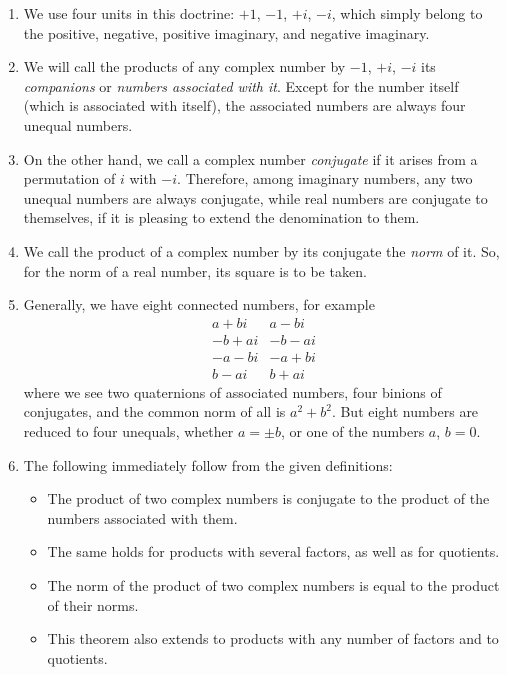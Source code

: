 \documentclass[twoside,12pt, showframe]{memoir}
\begin{document}
\begin{enumerate}
  \item We use four units in this doctrine: \(+1\), \(-1\), \(+i\), \(-i\), which simply belong to the positive, negative, positive imaginary, and negative imaginary.
  
  \item We will call the products of any complex number by \(-1\), \(+i\), \(-i\) its \textit{companions} or \textit{numbers associated with it}. Except for the number itself (which is associated with itself), the associated numbers are always four unequal numbers.
  
  \item On the other hand, we call a complex number \textit{conjugate} if it arises from a permutation of \(i\) with \(-i\). Therefore, among imaginary numbers, any two unequal numbers are always conjugate, while real numbers are conjugate to themselves, if it is pleasing to extend the denomination to them.
  
  \item We call the product of a complex number by its conjugate the \textit{norm} of it. So, for the norm of a real number, its square is to be taken.
  
  \item Generally, we have eight connected numbers, for example
  \[
  \begin{array}{r|r}
  a+bi & a-bi \\
  -b+ai & -b-ai \\
  -a-bi & -a+bi \\
  b-ai & b+ai
  \end{array}
  \]
  where we see two quaternions of associated numbers, four binions of conjugates, and the common norm of all is \(a^2+b^2\). But eight numbers are reduced to four unequals, whether \(a= \pm b\), or one of the numbers \(a\), \(b=0\).
  
  \item The following immediately follow from the given definitions:
  \begin{itemize}
    \item The product of two complex numbers is conjugate to the product of the numbers associated with them.
    \item The same holds for products with several factors, as well as for quotients.
    \item The norm of the product of two complex numbers is equal to the product of their norms.
    \item This theorem also extends to products with any number of factors and to quotients.
  \end{itemize}
  

\end{enumerate}
\end{document}
